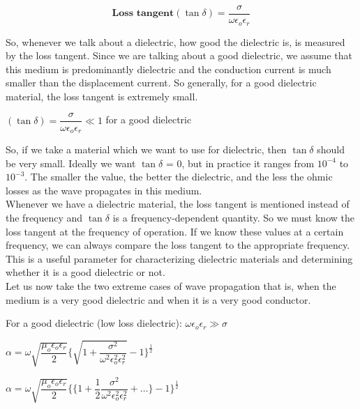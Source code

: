 \begin{equation}
\textbf{Loss tangent}(\tan\delta) = \dfrac{\sigma}{\omega\epsilon_{o}\epsilon_{r}}
\end{equation}

So, whenever we talk about a dielectric, how good the dielectric is, is measured by the loss tangent. Since we are talking about a good dielectric, we assume that this medium is predominantly dielectric and the conduction current is much smaller than the displacement current. So generally, for a good dielectric material, the loss tangent is extremely small. 

\begin{center}
$(\tan\delta) = \dfrac{\sigma}{\omega\epsilon_{o}\epsilon_{r}} \ll 1$ for a good dielectric
\end{center}

So, if we take a material which we want to use for dielectric, then $\tan\delta$ should be very small. Ideally we want $\tan\delta$ = 0, but in practice it ranges from $10^{-4}$ to $10^{-3}$. The smaller the value, the better the dielectric, and the less the ohmic losses as the wave propagates in this medium.\\ 
Whenever we have a dielectric material, the loss tangent is mentioned instead of the frequency and $\tan\delta$ is a frequency-dependent quantity. So we must know the loss tangent at the frequency of operation. If we know these values at a certain frequency, we can always compare the loss tangent to the appropriate frequency. This is a useful parameter for characterizing dielectric materials and determining whether it is a good dielectric or not.\\ 
Let us now take the two extreme cases of wave propagation that is, when the medium is a very good dielectric and when it is a very good conductor.

For a good dielectric (low loss dielectric): $\omega\epsilon_{o}\epsilon_{r} \gg \sigma$

\begin{center}
$\alpha = \omega\sqrt{\dfrac{\mu_{o}\epsilon_{o}\epsilon_{r}}{2}}\Bigg\{{\sqrt{1 + \dfrac{\sigma^{2}}{\omega^{2}\epsilon_{o}^{2}\epsilon_{r}^{2}}}} - 1\Bigg\}^{\frac{1}{2}}$
\end{center}

\begin{center}
$\alpha = \omega\sqrt{\dfrac{\mu_{o}\epsilon_{o}\epsilon_{r}}{2}}\Bigg\{\bigg\{1 + \dfrac{1}{2} \dfrac{\sigma^{2}}{\omega^{2}\epsilon_{o}^{2}\epsilon_{r}^{2}} + \dots\bigg\} - 1\Bigg\}^{\frac{1}{2}}$
\end{center}

